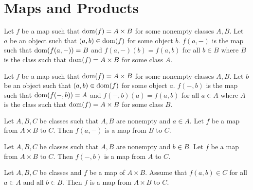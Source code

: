 \documentclass[10pt]{article}
\begin{document}
  \section{Maps and Products}

  \begin{forthel}
    \begin{definition}
      Let $f$ be a map such that $\operatorname{dom}(f) = A \times B$ for some nonempty
      classes $A, B$.
      Let $a$ be an object such that $(a,b) \in \operatorname{dom}(f)$ for some object $b$.
      $f(a,-)$ is the map such that $\operatorname{dom}(f(a,-)) = B$ and $f(a,-)(b) = f(a,b)$
      for all $b \in B$ where $B$ is the class such that $\operatorname{dom}(f) = A \times B$
      for some class $A$.
    \end{definition}
  \end{forthel}

  \begin{forthel}
    \begin{definition}
      Let $f$ be a map such that $\operatorname{dom}(f) = A \times B$ for some nonempty
      classes $A, B$.
      Let $b$ be an object such that $(a,b) \in \operatorname{dom}(f)$ for some object $a$.
      $f(-,b)$ is the map such that $\operatorname{dom}(f(-,b)) = A$ and $f(-,b)(a) = f(a,b)$
      for all $a \in A$ where $A$ is the class such that $\operatorname{dom}(f) = A \times B$
      for some class $B$.
    \end{definition}
  \end{forthel}

  \begin{forthel}
    \begin{proposition}
      Let $A, B, C$ be classes such that $A, B$ are nonempty and $a \in A$.
      Let $f$ be a map from $A \times B$ to $C$.
      Then $f(a,-)$ is a map from $B$ to $C$.
    \end{proposition}
  \end{forthel}

  \begin{forthel}
    \begin{proposition}
      Let $A, B, C$ be classes such that $A, B$ are nonempty and $b \in B$.
      Let $f$ be a map from $A \times B$ to $C$.
      Then $f(-,b)$ is a map from $A$ to $C$.
    \end{proposition}
  \end{forthel}

  \begin{forthel}
    \begin{proposition}
      Let $A, B, C$ be classes and $f$ be a map of $A \times B$.
      Assume that $f(a,b) \in C$ for all $a \in A$ and all $b \in B$.
      Then $f$ is a map from $A \times B$ to $C$.
    \end{proposition}
  \end{forthel}
\end{document}
